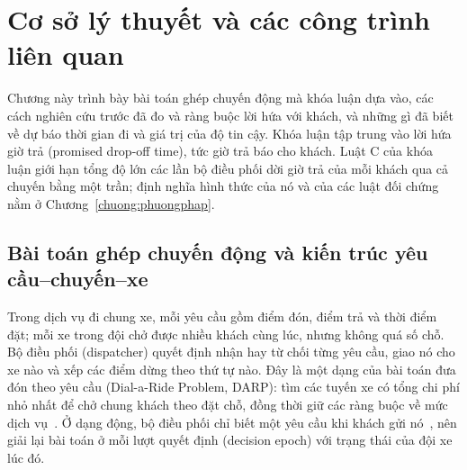 
\chapter{Cơ sở lý thuyết và các công trình liên quan}
\label{chuong:coso}

Chương này trình bày bài toán ghép chuyến động mà khóa luận dựa vào, các cách nghiên cứu trước đã đo và ràng buộc
lời hứa với khách, và những gì đã biết về dự báo thời gian đi và giá trị của độ tin cậy. Khóa luận tập trung vào lời
hứa giờ trả (promised drop-off time), tức giờ trả báo cho khách. Luật C của khóa luận giới
hạn tổng độ lớn các lần bộ điều phối dời giờ trả của mỗi khách qua cả chuyến bằng một trần; định nghĩa hình thức của
nó và của các luật đối chứng nằm ở Chương~\ref{chuong:phuongphap}.

\section{Bài toán ghép chuyến động và kiến trúc yêu cầu--chuyến--xe}
\label{muc:c2-baitoan}

Trong dịch vụ đi chung xe, mỗi yêu cầu gồm điểm đón, điểm trả và thời điểm đặt; mỗi xe trong đội chở được nhiều
khách cùng lúc, nhưng không quá số chỗ. Bộ điều phối (dispatcher) quyết định nhận hay từ chối từng yêu cầu, giao nó
cho xe nào và xếp các điểm dừng theo thứ tự nào. Đây là một dạng của bài toán đưa đón theo yêu cầu (Dial-a-Ride
Problem, DARP): tìm các tuyến xe có tổng chi phí nhỏ nhất để chở chung khách theo đặt chỗ, đồng thời giữ các ràng
buộc về mức dịch vụ~\cite{molenbruch2017}. Ở dạng động, bộ điều phối chỉ biết một yêu cầu khi khách gửi
nó~\cite{schulz2026}, nên giải lại bài toán ở mỗi lượt quyết định (decision epoch) với trạng thái của đội xe lúc đó.

